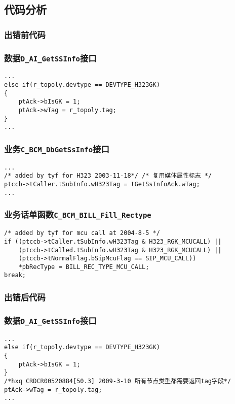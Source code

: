 \documentclass[12pt,a4paper,onecolumn]{article}
\begin{document}
\subsection{代码分析}
\subsubsection{出错前代码}
\subsubsection{数据\lstinline{D_AI_GetSSInfo}接口}
\begin{footnotesize}
\begin{lstlisting}
...
else if(r_topoly.devtype == DEVTYPE_H323GK)
{
    ptAck->bIsGK = 1;
    ptAck->wTag = r_topoly.tag;
}
...
\end{lstlisting}
\end{footnotesize}
\subsubsection{业务\lstinline{C_BCM_DbGetSsInfo}接口}
\begin{footnotesize}
\begin{lstlisting}
...
/* added by tyf for H323 2003-11-18*/ /* 复用媒体属性标志 */
ptccb->tCaller.tSubInfo.wH323Tag = tGetSsInfoAck.wTag;  		
...
\end{lstlisting}
\end{footnotesize}

\subsubsection{业务话单函数\lstinline{C_BCM_BILL_Fill_Rectype}}
\begin{footnotesize}
\begin{lstlisting}
/* added by tyf for mcu call at 2004-8-5 */
if ((ptccb->tCaller.tSubInfo.wH323Tag & H323_RGK_MCUCALL) ||
	(ptccb->tCalled.tSubInfo.wH323Tag & H323_RGK_MCUCALL) ||
	(ptccb->tNormalFlag.bSipMcuFlag == SIP_MCU_CALL))
	*pbRecType = BILL_REC_TYPE_MCU_CALL;
break;
\end{lstlisting}
\end{footnotesize}
\subsubsection{出错后代码}
\subsubsection{数据\lstinline{D_AI_GetSSInfo}接口}
\begin{footnotesize}
\begin{lstlisting}
...
else if(r_topoly.devtype == DEVTYPE_H323GK)
{
	ptAck->bIsGK = 1;
}
/*hxq CRDCR00520884[50.3] 2009-3-10 所有节点类型都需要返回tag字段*/
ptAck->wTag = r_topoly.tag;
...
\end{lstlisting}
\end{footnotesize}
\end{document}
